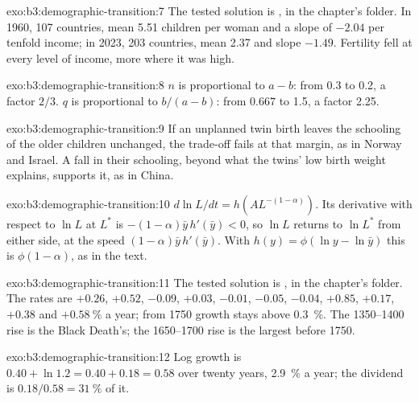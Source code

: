 \begin{solution}{exo:b3:demographic-transition:7}
The tested solution is , in the chapter's
 folder. In 1960, 107 countries, mean 5.51 children per woman and a slope of $-2.04$ per
tenfold income; in 2023, 203 countries, mean 2.37 and slope $-1.49$. Fertility fell at every level
of income, more where it was high. %
\end{solution}

\begin{solution}{exo:b3:demographic-transition:8}
$n$ is proportional to $a - b$: from 0.3 to 0.2, a factor $2/3$. $q$ is proportional to $b/(a - b)$: from $0.667$ to 1.5, a factor 2.25.
\end{solution}

\begin{solution}{exo:b3:demographic-transition:9}
If an unplanned twin birth leaves the schooling of the older children unchanged,
the trade-off fails at that margin, as in Norway and Israel. A fall in their schooling,
beyond what the twins' low birth weight explains, supports it, as in China.
\end{solution}

\begin{solution}{exo:b3:demographic-transition:10}
$d\ln L/dt = h(A L^{-(1 - \alpha)})$. Its derivative with respect to $\ln L$ at $L^*$ is $-(1 - \alpha)\bar y\,h'(\bar y) < 0$, so $\ln L$ returns to $\ln L^*$ from
either side, at the speed $(1 - \alpha)\bar y\,h'(\bar y)$. With $h(y) = \phi(\ln y - \ln \bar y)$ this is $\phi(1 - \alpha)$, as in the text.
\end{solution}

\begin{solution}{exo:b3:demographic-transition:11}
The tested solution is , in the chapter's
 folder. The rates are $+0.26$, $+0.52$, $-0.09$, $+0.03$, $-0.01$, $-0.05$, $-0.04$, $+0.85$, $+0.17$, $+0.38$ and $+0.58~\%$ a year; from 1750 growth stays
above 0.3~\%. %
The 1350--1400 rise is the Black Death's; the 1650--1700 rise is the largest before 1750.
\end{solution}

\begin{solution}{exo:b3:demographic-transition:12}
Log growth is $0.40 + \ln 1.2 = 0.40 + 0.18 = 0.58$ over twenty years, 2.9~\% a year; the dividend is $0.18/0.58 = 31~\%$ of it.
\end{solution}

